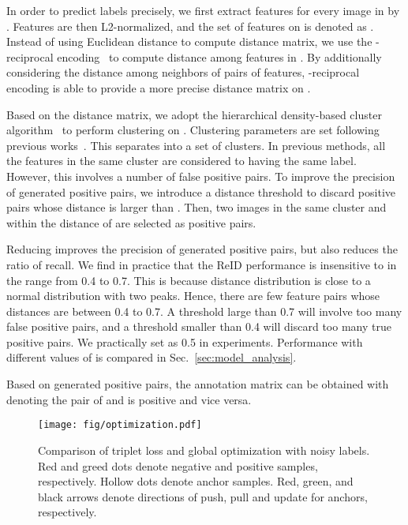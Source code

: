 \documentclass[sigconf]{acmart}
\begin{document}
In order to predict labels precisely, we first extract features for every image in  by . Features are then L2-normalized, and the set of features on  is denoted as . Instead of using Euclidean distance to compute distance matrix, we use the -reciprocal encoding~\cite{zhong2017re} to compute distance among features in . By additionally considering the distance among neighbors of pairs of features, -reciprocal encoding is able to provide a more precise distance matrix on .

Based on the distance matrix, we adopt the hierarchical density-based cluster algorithm~\cite{campello2013density} to perform clustering on . Clustering parameters are set following previous works~\cite{ssg,adaptive-reid}. This separates  into a set of clusters. In previous methods, all the features in the same cluster are considered to having the same label. However, this involves a number of false positive pairs. To improve the precision of generated positive pairs, we introduce a distance threshold  to discard positive pairs whose distance is larger than . Then, two images in the same cluster and within the distance of  are selected as positive pairs. 

Reducing  improves the precision of generated positive pairs, but also reduces the ratio of recall. We find in practice that the ReID performance is insensitive to  in the range from 0.4 to 0.7. This is because distance distribution is close to a normal distribution with two peaks. Hence, there are few feature pairs whose distances are between 0.4 to 0.7. A threshold large than 0.7 will involve too many false positive pairs, and a threshold smaller than 0.4 will discard too many true positive pairs. We practically set  as 0.5 in experiments. Performance with different values of  is compared in Sec.~\ref{sec:model_analysis}.

Based on generated positive pairs, the annotation matrix  can be obtained with  denoting the pair of  and  is positive and vice versa.

\begin{figure}[t]
\begin{center}
\texttt{[image: fig/optimization.pdf]}
\end{center}
\vspace{-4mm}
\caption{Comparison of triplet loss and global optimization with noisy labels. Red and greed dots denote negative and positive samples, respectively. Hollow dots denote anchor samples. Red, green, and black arrows denote directions of push, pull and update for anchors, respectively.}
\label{fig:optimization}
\vspace{-4mm}
\end{figure}
\end{document}
